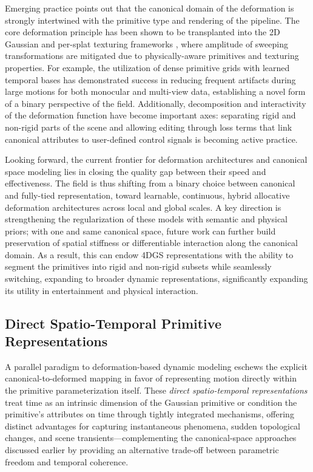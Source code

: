\documentclass[11pt,a4paper]{article}
\begin{document}
Emerging practice points out that the canonical domain of the deformation is strongly intertwined with the primitive type and rendering of the pipeline. The core deformation principle has been shown to be transplanted into the 2D Gaussian and per-splat texturing frameworks \cite{arxiv:2507.20200v1}, where amplitude of sweeping transformations are mitigated due to physically-aware primitives and texturing properties. For example, the utilization of dense primitive grids with learned temporal bases\cite{arxiv:2507.20200v1} has demonstrated success in reducing frequent artifacts during large motions for both monocular and multi-view data, establishing a novel form of a binary perspective of the field. Additionally, decomposition and interactivity of the deformation function have become important axes: separating rigid and non-rigid parts of the scene and allowing editing through loss terms that link canonical attributes to user-defined control signals is becoming active practice\cite{arxiv:2403.11134v2}.

Looking forward, the current frontier for deformation architectures and canonical space modeling lies in closing the quality gap between their speed and effectiveness. The field is thus shifting from a binary choice between canonical and fully-tied representation, toward learnable, continuous, hybrid allocative deformation architectures across local and global scales. A key direction is strengthening the regularization of these models with semantic and physical priors; with one and same canonical space, future work can further build preservation of spatial stiffness or differentiable interaction along the canonical domain\cite{arxiv:2402.07181v1}\cite{arxiv:2403.11134v2}. As a result, this can endow 4DGS representations with the ability to segment the primitives into rigid and non-rigid subsets while seamlessly switching, expanding to broader dynamic representations\cite{arxiv:2510.18101v1}, significantly expanding its utility in entertainment and physical interaction.


\subsection{Direct Spatio-Temporal Primitive Representations}


A parallel paradigm to deformation-based dynamic modeling eschews the explicit canonical-to-deformed mapping in favor of representing motion directly within the primitive parameterization itself. These \emph{direct spatio-temporal representations} treat time as an intrinsic dimension of the Gaussian primitive or condition the primitive's attributes on time through tightly integrated mechanisms, offering distinct advantages for capturing instantaneous phenomena, sudden topological changes, and scene transients---complementing the canonical-space approaches discussed earlier by providing an alternative trade-off between parametric freedom and temporal coherence.
\end{document}
